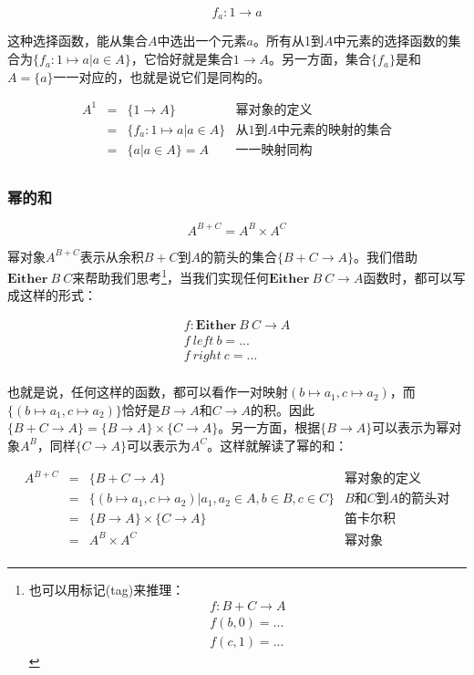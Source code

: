 \documentclass{article}
\begin{document}
\[
  f_a : 1 \to a
\]

这种选择函数，能从集合$A$中选出一个元素$a$。所有从1到$A$中元素的选择函数的集合为$\{f_a : 1 \mapsto a | a \in A\}$，它恰好就是集合$1 \to A$。另一方面，集合$\{ f_a \}$是和$A = \{a\}$一一对应的，也就是说它们是同构的。

\[
\begin{array}{rcll}
A^1 & = & \{ 1 \to A \} & \text{幂对象的定义} \\
    & = & \{ f_a : 1 \mapsto a | a \in A \} & \text{从1到$A$中元素的映射的集合} \\
    & = & \{ a | a \in A \} = A & \text{一一映射同构} \\
\end{array}
\]

\subsubsection{幂的和}

\[
  A^{B + C} = A^B \times A^C
\]

幂对象$A^{B + C}$表示从余积$B + C$到$A$的箭头的集合$\{B + C \to A\}$。我们借助$\mathbf{Either}\ B\ C$来帮助我们思考\footnote{也可以用标记(tag)来推理：
\[
\begin{array}{l}
f : B + C \to A \\
f (b, 0) = ... \\
f (c, 1) = ...
\end{array}
\]
}，当我们实现任何$\mathbf{Either}\ B\ C \to A$函数时，都可以写成这样的形式：

\[
\begin{array}{l}
f : \mathbf{Either}\ B\ C \to A \\
f\ left\ b = ... \\
f\ right\ c = ... \\
\end{array}
\]

也就是说，任何这样的函数，都可以看作一对映射$(b \mapsto a_1, c \mapsto a_2)$，而$\{(b \mapsto a_1, c \mapsto a_2)\}$恰好是$B \to A$和$C \to A$的积。因此$\{B + C \to A\} = \{B \to A\} \times \{C \to A\}$。另一方面，根据$\{B \to A\}$可以表示为幂对象$A^B$，同样$\{C \to A\}$可以表示为$A^C$。这样就解读了幂的和：

\[
\begin{array}{rcll}
A^{B + C} & = & \{ B + C \to A \} & \text{幂对象的定义} \\
    & = & \{ (b \mapsto a_1,  c \mapsto a_2) | a_1, a_2 \in A, b \in B, c \in C\} & \text{$B$和$C$到$A$的箭头对} \\
    & = & \{ B \to A \} \times \{ C \to A \} & \text{笛卡尔积} \\
    & = & A^B \times A^C & \text{幂对象} \\
\end{array}
\]
\end{document}
